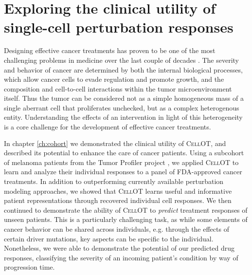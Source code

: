 \section{Exploring the clinical utility of single-cell perturbation responses}
Designing effective cancer treatments has proven to be one of the most challenging problems in medicine over the last couple of decades \cite{}.
The severity and behavior of cancer are determined by both the internal biological processes, which allow cancer cells to evade regulation and promote growth, and the composition and cell-to-cell interactions within the tumor microenvironment itself.
Thus the tumor can be considered not as a simple homogeneous mass of a single aberrant cell that proliferates unchecked, but as a complex heterogenous entity.
Understanding the effects of an intervention in light of this heterogeneity is a core challenge for the development of effective cancer treatments.

In chapter \ref{ch:cohort} we demonstrated the clinical utility of \textsc{CellOT},
and described its potential to enhance the care of cancer patients.
Using a subcohort of melanoma patients from the Tumor Profiler project \cite{irmisch2020},
we applied \textsc{CellOT} to learn and analyze their individual responses to a panel of FDA-approved cancer treatments.
In addition to outperforming currently available perturbation modeling approaches, we showed that \textsc{CellOT} learns useful and informative patient representations through recovered individual cell responses.
We then continued to demonstrate the ability of \textsc{CellOT} to \emph{predict} treatment responses of unseen patients.
This is a particularly challenging task, as while some elements of cancer behavior can be shared across individuals, e.g. through the effects of certain driver mutations, key aspects can be specific to the individual.
Nonetheless, we were able to demonstrate the potential of our predicted drug responses, classifying the severity of an incoming patient's condition by way of progression time.

